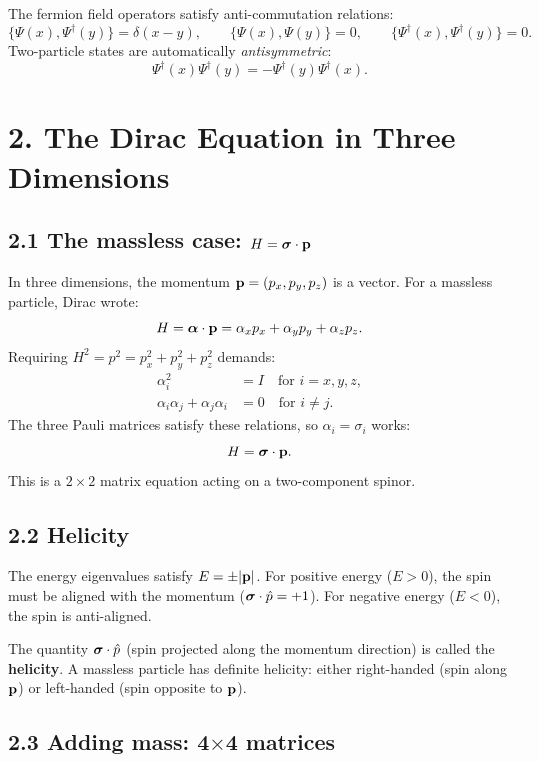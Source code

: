 \documentclass[12pt,a4paper]{article}
\begin{document}
The fermion field operators satisfy anti-commutation relations:
\[
    \{\Psi(x), \Psi^\dagger(y)\} = \delta(x - y), \qquad \{\Psi(x), \Psi(y)\} = 0, \qquad \{\Psi^\dagger(x), \Psi^\dagger(y)\} = 0.
\]
Two-particle states are automatically \emph{antisymmetric}:
\[
    \Psi^\dagger(x)\Psi^\dagger(y) = -\Psi^\dagger(y)\Psi^\dagger(x).
\]

\section{2. The Dirac Equation in Three Dimensions}

\subsection{2.1 The massless case: $H = \vb*{\sigma}\cdot\vb{p}$}

In three dimensions, the momentum $\vb{p} = (p_x, p_y, p_z)$ is a vector.  For a massless particle, Dirac wrote:
\[
    H = \vb*{\alpha}\cdot\vb{p} = \alpha_x p_x + \alpha_y p_y + \alpha_z p_z.
\]
Requiring $H^2 = p^2 = p_x^2 + p_y^2 + p_z^2$ demands:
\begin{align}
    \alpha_i^2 &= I \quad \text{for } i = x, y, z, \\
    \alpha_i\alpha_j + \alpha_j\alpha_i &= 0 \quad \text{for } i \neq j.
\end{align}
The three Pauli matrices satisfy these relations, so $\alpha_i = \sigma_i$ works:
\[
    H = \vb*{\sigma}\cdot\vb{p}.
\]
This is a $2 \times 2$ matrix equation acting on a two-component spinor.

\subsection{2.2 Helicity}

The energy eigenvalues satisfy $E = \pm|\vb{p}|$.  For positive energy ($E > 0$), the spin must be aligned with the momentum ($\vb*{\sigma}\cdot\hat{p} = +1$).  For negative energy ($E < 0$), the spin is anti-aligned.

The quantity $\vb*{\sigma}\cdot\hat{p}$ (spin projected along the momentum direction) is called the \textbf{helicity}.  A massless particle has definite helicity: either right-handed (spin along $\vb{p}$) or left-handed (spin opposite to $\vb{p}$).

\subsection{2.3 Adding mass: 4$\times$4 matrices}
\end{document}
